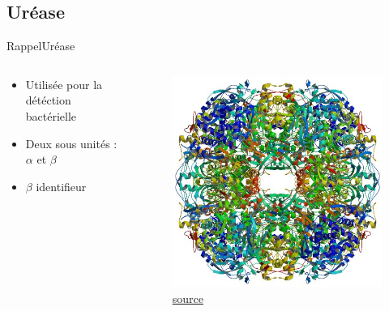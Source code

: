 \documentclass{PresentationHEIGVD}
\begin{document}
\subsection{Uréase}
\begin{frame}{Rappel}{Uréase}
\begin{columns}[c]
	\begin{column}[c]{5cm}
		\begin{itemize}[<+->]
			\item Utilisée pour la détéction bactérielle
			\item Deux sous unités : $\alpha$ et $\beta$
			\item $\beta$ identifieur
		\end{itemize}
	\end{column}
	\begin{column}[c]{5cm}	
		\begin{figure}
		\includegraphics[width=\textwidth]{img/urease.jpg}
		\caption{\href{http://www.rcsb.org/pdb/images/1E9Z_bio_r_500.jpg}{source}}
	\end{figure}
	\end{column}
\end{columns}
\end{frame}
\end{document}
